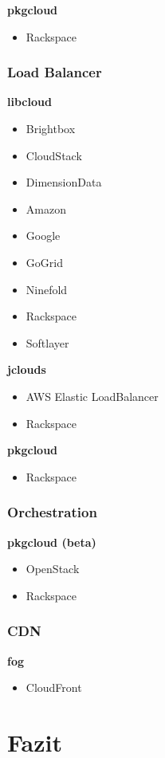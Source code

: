 \documentclass[11pt]{scrartcl}
\begin{document}
\textbf{pkgcloud}
\begin{itemize}
\item Rackspace
\end{itemize}

\subsubsection{Load Balancer}
\textbf{libcloud}
\begin{itemize}
\item Brightbox
\item CloudStack
\item DimensionData
\item Amazon
\item Google
\item GoGrid
\item Ninefold
\item Rackspace
\item Softlayer
\end{itemize}

\textbf{jclouds}
\begin{itemize}
\item AWS Elastic LoadBalancer
\item Rackspace
\end{itemize}

\textbf{pkgcloud}
\begin{itemize}
\item Rackspace
\end{itemize}

\subsubsection{Orchestration}
\textbf{pkgcloud (beta)}
\begin{itemize}
\item OpenStack
\item Rackspace
\end{itemize}

\subsubsection{CDN}
\textbf{fog}
\begin{itemize}
\item CloudFront
\end{itemize}

\newpage

\section{Fazit}
\end{document}
